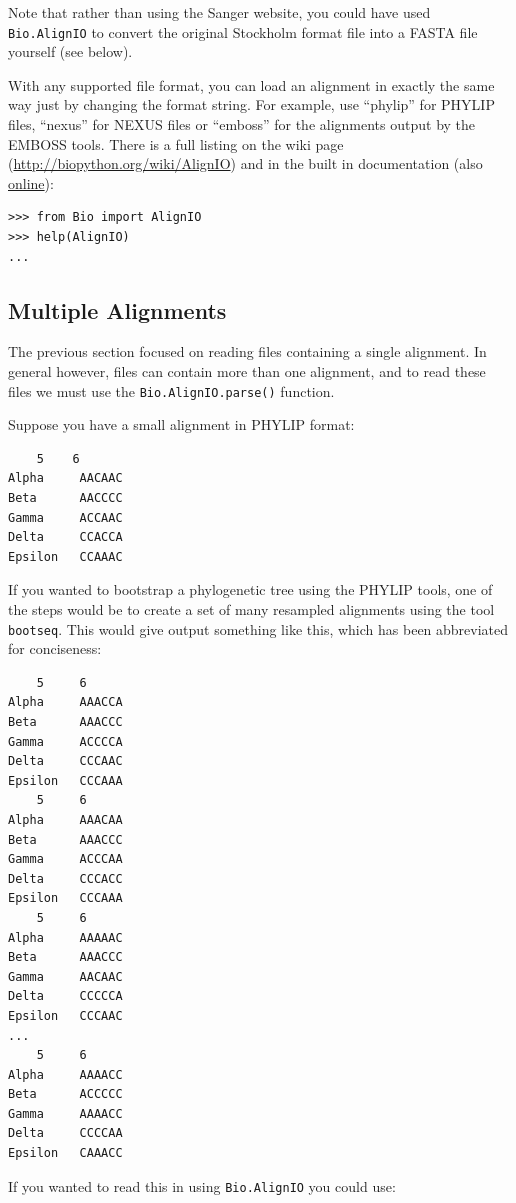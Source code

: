\documentclass{report}
\begin{document}
Note that rather than using the Sanger website, you could have used \verb|Bio.AlignIO| to convert the original Stockholm format file into a FASTA file yourself (see below).

With any supported file format, you can load an alignment in exactly the same way just by changing the format string.  For example, use ``phylip'' for PHYLIP files, ``nexus'' for NEXUS files or ``emboss'' for the alignments output by the EMBOSS tools.  There is a full listing on the wiki page (\url{http://biopython.org/wiki/AlignIO}) and in the built in documentation (also \href{http://biopython.org/DIST/docs/api/Bio.AlignIO-module.html}{online}):

\begin{verbatim}
>>> from Bio import AlignIO
>>> help(AlignIO)
...
\end{verbatim}

\subsection{Multiple Alignments}

The previous section focused on reading files containing a single alignment.  In general however, files can contain more than one alignment, and to read these files we must use the \verb|Bio.AlignIO.parse()| function.

Suppose you have a small alignment in PHYLIP format:

\begin{verbatim}
    5    6
Alpha     AACAAC
Beta      AACCCC
Gamma     ACCAAC
Delta     CCACCA
Epsilon   CCAAAC
\end{verbatim}

If you wanted to bootstrap a phylogenetic tree using the PHYLIP tools, one of the steps would be to create a set of many resampled alignments using the tool \verb|bootseq|.  This would give output something like this, which has been abbreviated for conciseness:

\begin{verbatim}
    5     6
Alpha     AAACCA
Beta      AAACCC
Gamma     ACCCCA
Delta     CCCAAC
Epsilon   CCCAAA
    5     6
Alpha     AAACAA
Beta      AAACCC
Gamma     ACCCAA
Delta     CCCACC
Epsilon   CCCAAA
    5     6
Alpha     AAAAAC
Beta      AAACCC
Gamma     AACAAC
Delta     CCCCCA
Epsilon   CCCAAC
...
    5     6
Alpha     AAAACC
Beta      ACCCCC
Gamma     AAAACC
Delta     CCCCAA
Epsilon   CAAACC
\end{verbatim}

If you wanted to read this in using \verb|Bio.AlignIO| you could use:
\end{document}
